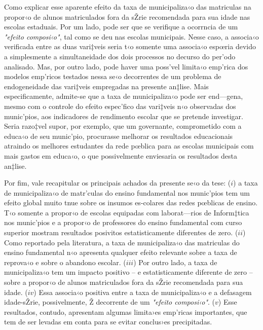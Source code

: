 \documentclass[a4paper, 12pt]{article}
\begin{document}
Como explicar esse aparente efeito da taxa de municipaliza‹o das matriculas na propor‹o de alunos matriculados fora da sŽrie recomendada para sua idade nas escolas estaduais. Por um lado, pode ser que se verifique a ocorrncia de um  \emph{"efeito composi‹o"}, tal como se deu nas escolas municipais. Nesse caso, a associa‹o verificada entre as duas vari‡veis seria t‹o somente uma associa‹o espœria devido a simplesmente a simultaneidade dos dois processos no decurso do per’odo analisado. Mas, por outro lado, pode haver uma poss’vel limita‹o emp’rica dos modelos emp’ricos testados nessa se‹o decorrentes de um problema de endogeneidade das vari‡veis empregadas na presente an‡lise. Mais especificamente, admite-se que a taxa de municipaliza‹o pode ser end—gena, mesmo com o controle do efeito espec’fico das vari‡veis n‹o observadas dos munic’pios,  aos indicadores de rendimento escolar que se pretende investigar. Seria razo‡vel supor, por exemplo, que um governante, comprometido com a educa‹o de seu munic’pio, procurasse melhorar os resultados educacionais atraindo os melhores estudantes da rede pœblica para as escolas municipais com mais gastos em educa‹o, o que possivelmente enviesaria os resultados desta an‡lise. 

Por fim, vale recapitular os principais achados da presente se‹o da tese: ($i$) a taxa de municipaliza‹o de matr’culas do ensino fundamental nos munic’pios tem um efeito global muito tnue sobre os insumos es-colares das redes pœblicas de ensino. T‹o somente a propor‹o de escolas equipadas com laborat—rios de Inform‡tica nos munic’pios e a propor‹o de professores do ensino fundamental com curso superior mostram resultados posivitos estatisticamente diferentes de zero. ($ii$) Como reportado pela literatura, a taxa de municipaliza‹o das matriculas do ensino fundamental n‹o apresenta qualquer efeito relevante sobre a taxa de reprova‹o e sobre o abandono escolar. ($iii$) Por outro lado, a taxa de municipaliza‹o tem um impacto positivo -- e estatisticamente diferente de zero --sobre a propor‹o de alunos matriculados fora da sŽrie recomendada para sua idade. ($iv$) Essa associa‹o positiva entre a taxa de municipaliza‹o e a defasagem idade-sŽrie, possivelmente, Ž decorrente de um \emph{"efeito composi‹o"}.  ($v$)  Esse resultados, contudo, apresentam algumas limita›es emp’ricas importantes, que tem de ser levadas em conta para se evitar conclus›es precipitadas.


\end{document}

